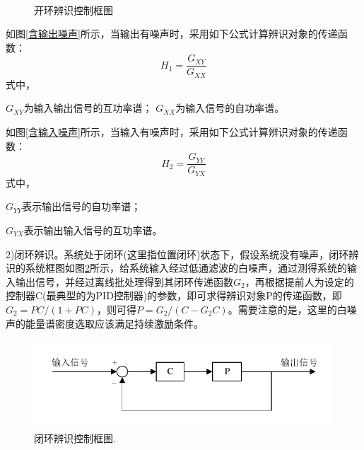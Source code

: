\begin{figure}[H]\centering
	\\
	\caption{开环辨识控制框图}\label{开环辨识控制框图}
\end{figure}

如图\ref{含输出噪声}所示，当输出有噪声时，采用如下公式计算辨识对象的传递函数：
\begin{equation}
H_1=\frac{G_{XY}}{G_{XX}}
\end{equation}
式中，

$G_{XY}$为输入输出信号的互功率谱；
$G_{XX}$为输入信号的自功率谱。

如图\ref{含输入噪声}所示，当输入有噪声时，采用如下公式计算辨识对象的传递函数：
\begin{equation}
H_2=\frac{G_{YY}}{G_{YX}}
\end{equation}
式中，

$G_{YY}$表示输出信号的自功率谱；

$G_{YX}$表示输出输入信号的互功率谱。

2)闭环辨识。系统处于闭环(这里指位置闭环)状态下，假设系统没有噪声，闭环辨识的系统框图如图\ref{闭环辨识控制框图}所示，给系统输入经过低通滤波的白噪声，通过测得系统的输入输出信号，并经过离线批处理得到其闭环传递函数$G_2$，再根据提前人为设定的控制器C(最典型的为PID控制器)的参数，即可求得辨识对象P的传递函数，即$G_2=PC/(1+PC)$，则可得$P=G_2/(C-G_2C)$。需要注意的是，这里的白噪声的能量谱密度选取应该满足持续激励条件。
\begin{figure}[H]
	\centering
	\includegraphics[width=12cm]{figures/闭环测试.pdf}
	\caption{闭环辨识控制框图.}
	\label{闭环辨识控制框图}
\end{figure}


